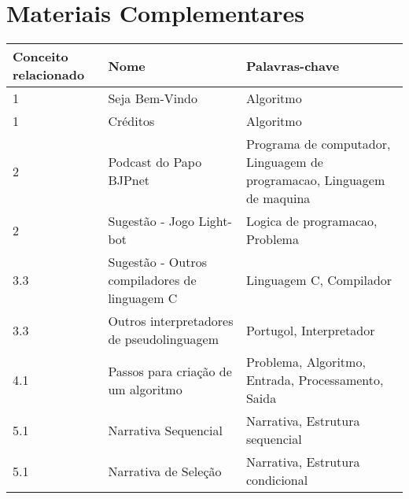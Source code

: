 \section{Materiais Complementares}

\begin{longtable}{| p{} | p{} | p{} |}
\hline
Conceito relacionado & Nome                                                       & Palavras-chave                                                                                         \\ \hline
1                    & Seja Bem-Vindo                                             & Algoritmo                                                                                              \\ \hline
1                    & Créditos                                                   & Algoritmo                                                                                              \\ \hline
2                    & Podcast do Papo BJPnet                                     & Programa de computador, Linguagem de programacao, Linguagem de maquina                                 \\ \hline
2                    & Sugestão - Jogo Light-bot                                  & Logica de programacao, Problema                                                                        \\ \hline
3.3                  & Sugestão - Outros compiladores de linguagem C              & Linguagem C, Compilador                                                                                \\ \hline
3.3                  & Outros interpretadores de pseudolinguagem                  & Portugol, Interpretador                                                                                \\ \hline
4.1                  & Passos para criação de um algoritmo                        & Problema, Algoritmo, Entrada, Processamento, Saida                                                     \\ \hline
5.1                  & Narrativa Sequencial                                       & Narrativa, Estrutura sequencial                                                                        \\ \hline
5.1                  & Narrativa de Seleção                                       & Narrativa, Estrutura condicional                                                                       \\ \hline

\end{longtable}
